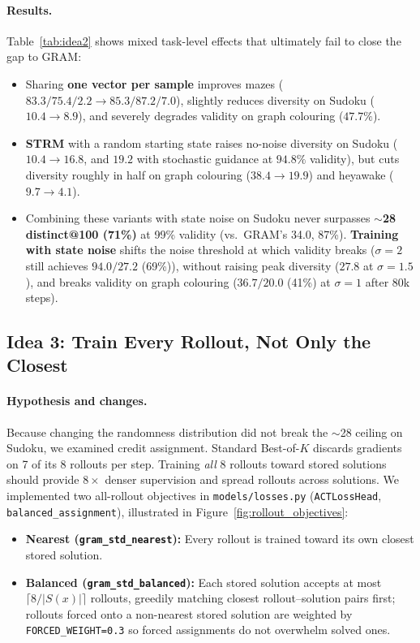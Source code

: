 \documentclass[11pt]{article}
\newcommand{\Bok}{Best-of-$K$}
\begin{document}
\paragraph{Results.}
Table~\ref{tab:idea2} shows mixed task-level effects that ultimately fail to close the gap to GRAM:
\begin{itemize}
  \item Sharing \textbf{one vector per sample} improves mazes ($83.3 / 75.4 / 2.2 \to 85.3 / 87.2 / 7.0$), slightly reduces diversity on Sudoku ($10.4 \to 8.9$), and severely degrades validity on graph colouring ($47.7\%$).
  \item \textbf{STRM} with a random starting state raises no-noise diversity on Sudoku ($10.4 \to 16.8$, and $19.2$ with stochastic guidance at $94.8\%$ validity), but cuts diversity roughly in half on graph colouring ($38.4 \to 19.9$) and heyawake ($9.7 \to 4.1$).
  \item Combining these variants with state noise on Sudoku never surpasses \textbf{$\sim$28 distinct@100 (71\%)} at 99\% validity (vs.\ GRAM's 34.0, 87\%). \textbf{Training with state noise} shifts the noise threshold at which validity breaks ($\sigma=2$ still achieves $94.0 / 27.2$ (69\%)), without raising peak diversity ($27.8$ at $\sigma=1.5$), and breaks validity on graph colouring ($36.7 / 20.0$ (41\%) at $\sigma=1$ after 80k steps).
\end{itemize}

\subsection{Idea 3: Train Every Rollout, Not Only the Closest}
\label{sec:idea3}

\paragraph{Hypothesis and changes.}
Because changing the randomness distribution did not break the $\sim$28 ceiling on Sudoku, we examined credit assignment. Standard \Bok{} discards gradients on 7 of its 8 rollouts per step. Training \emph{all} 8 rollouts toward stored solutions should provide $8\times$ denser supervision and spread rollouts across solutions. We implemented two all-rollout objectives in \texttt{models/losses.py} (\texttt{ACTLossHead}, \texttt{balanced\_assignment}), illustrated in Figure~\ref{fig:rollout_objectives}:
\begin{itemize}
  \item \textbf{Nearest (\texttt{gram\_std\_nearest}):} Every rollout is trained toward its own closest stored solution.
  \item \textbf{Balanced (\texttt{gram\_std\_balanced}):} Each stored solution accepts at most $\lceil 8 / |S(x)| \rceil$ rollouts, greedily matching closest rollout--solution pairs first; rollouts forced onto a non-nearest stored solution are weighted by \texttt{FORCED\_WEIGHT=0.3} so forced assignments do not overwhelm solved ones.
\end{itemize}
\end{document}
